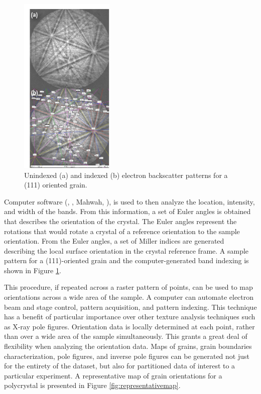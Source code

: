 \begin{figure}
\begin{center}
\includegraphics[width=0.4\textwidth]{ebsdsamples.pdf}
\caption[Electron backscatter diffraction patterns]{%
	Unindexed (a) and indexed (b) electron backscatter patterns 
	for a (111) oriented  grain.}
\label{fig:ebsdsamples}
\end{center}
\end{figure}
Computer software (, , Mahwah, ), is used to then analyze
the location, intensity, and width of the bands. From this information, a set of Euler
angles is obtained that describes the orientation of the crystal. The Euler angles
represent the rotations that would rotate a crystal of a reference orientation to the
sample orientation. From the Euler angles, a set of Miller indices are generated
describing the local surface orientation in the crystal reference frame. A sample pattern
for a (111)-oriented  grain and the computer-generated band indexing is shown
in Figure \ref{fig:ebsdsamples}.


This procedure, if repeated across a raster pattern of points, can be used to map
orientations across a wide area of the sample. A computer can automate electron beam and
stage control, pattern acquisition, and pattern indexing. This technique has a benefit of
particular importance over other texture analysis techniques such as X-ray pole figures.
Orientation data is locally determined at each point, rather than over a wide area of the
sample simultaneously. This grants a great deal of flexibility when analyzing the
orientation data. Maps of grains, grain boundaries characterization, pole figures, and
inverse pole figures can be generated not just for the entirety  of the dataset, but also
for partitioned data of interest to a particular experiment. A representative map of grain
orientations for a  polycrystal is presented in Figure
\ref{fig:representativemap}.


